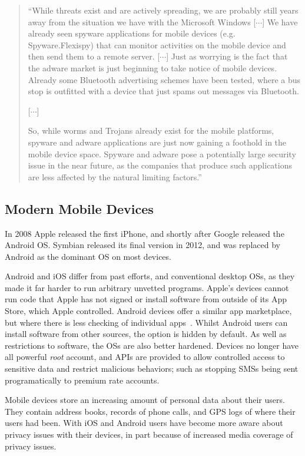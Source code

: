 \documentclass[thesis.tex]{subfiles}
\begin{document}
\begin{quote}
  ``While threats exist and are actively spreading, we are probably
  still years away from the situation we have with the Microsoft Windows
  [$\cdots$] We have already seen spyware applications for mobile devices
  (e.g. Spyware.Flexispy) that can monitor activities on the mobile
  device and then send them to a remote server. [$\cdots$] Just as
  worrying is the fact that the adware market is just beginning to take
  notice of mobile devices. Already some Bluetooth advertising schemes
  have been tested, where a bus stop is outfitted with a device that
  just spams out messages via Bluetooth.

  [$\cdots$]
  
  So, while worms and Trojans already exist for the mobile
  platforms, spyware and adware applications are just now gaining a
  foothold in the mobile device space. Spyware and adware pose a
  potentially large security issue in the near future, as the companies
  that produce such applications are less affected by the natural
  limiting factors.''
\end{quote}

\subsection{Modern Mobile Devices}

In 2008 Apple released the first iPhone, and shortly after Google
released the Android OS.  Symbian released its final version in
2012, and was replaced by Android as the dominant OS on most devices.  

Android and iOS differ from past efforts, and conventional desktop OSs, as they
made it far harder to run arbitrary unvetted programs. Apple's devices cannot
run code that Apple has not signed or install software from outside of its App
Store, which Apple controlled. Android devices offer a similar app marketplace,
but where there is less checking of individual
apps~\cite{oberheide_dissecting_2012}. Whilst Android users can install software
from other sources, the option is hidden by default. As well as restrictions to
software, the OSs are also better hardened. Devices no longer have all powerful
\emph{root} account, and APIs are provided to allow controlled access to
sensitive data and restrict malicious behaviors; such as stopping SMSs being
sent programatically to premium rate accounts.

Mobile devices store an increasing amount of personal data about their users.
They contain address books, records of phone calls, and GPS logs of where their
users had been. With iOS and Android users have become more aware about privacy
issues with their devices, in part because of increased media coverage of
privacy issues.
\end{document}
